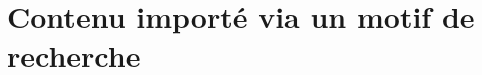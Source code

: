 \documentclass[varwidth, border = 3pt]{standalone}
\begin{document}
\section{Contenu importé via un motif de recherche}

%
%
%
\end{document}
